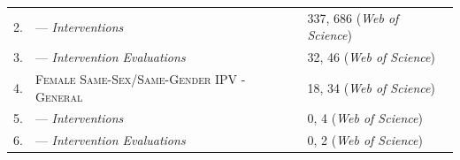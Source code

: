 \documentclass[11pt,]{tufte-book}
\begin{document}
\begin{longtable}[]{@{}lll@{}}
\begin{minipage}[t]{0.03\columnwidth}
2.\strut
\end{minipage} & \begin{minipage}[t]{0.44\columnwidth}\raggedright\strut
--- \textit{Interventions}\strut
\end{minipage} & \begin{minipage}[t]{0.45\columnwidth}\raggedright\strut
337, 686 (\textit{Web of Science})\strut
\end{minipage}\tabularnewline
\begin{minipage}[t]{0.03\columnwidth}\raggedright\strut
3.\strut
\end{minipage} & \begin{minipage}[t]{0.44\columnwidth}\raggedright\strut
--- \textit{Intervention Evaluations}\strut
\end{minipage} & \begin{minipage}[t]{0.45\columnwidth}\raggedright\strut
32, 46 (\textit{Web of Science})\strut
\end{minipage}\tabularnewline
\begin{minipage}[t]{0.03\columnwidth}\raggedright\strut
4.\strut
\end{minipage} & \begin{minipage}[t]{0.44\columnwidth}\raggedright\strut
\textsc{Female Same-Sex/Same-Gender IPV - General}\strut
\end{minipage} & \begin{minipage}[t]{0.45\columnwidth}\raggedright\strut
18, 34 (\textit{Web of Science})\strut
\end{minipage}\tabularnewline
\begin{minipage}[t]{0.03\columnwidth}\raggedright\strut
5.\strut
\end{minipage} & \begin{minipage}[t]{0.44\columnwidth}\raggedright\strut
--- \textit{Interventions}\strut
\end{minipage} & \begin{minipage}[t]{0.45\columnwidth}\raggedright\strut
0, 4 (\textit{Web of Science})\strut
\end{minipage}\tabularnewline
\begin{minipage}[t]{0.03\columnwidth}\raggedright\strut
6.\strut
\end{minipage} & \begin{minipage}[t]{0.44\columnwidth}\raggedright\strut
--- \textit{Intervention Evaluations}\strut
\end{minipage} & \begin{minipage}[t]{0.45\columnwidth}\raggedright\strut
0, 2 (\textit{Web of Science})\strut
\end{minipage}\tabularnewline
\bottomrule
\end{longtable}
\end{document}
